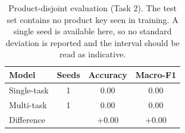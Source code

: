\begin{table}[t]
\caption{Product-disjoint evaluation (Task 2). The test set contains no product key seen in training. A single seed is available here, so no standard deviation is reported and the interval should be read as indicative.}
\label{tab:disjoint}
\centering
\small
\begin{tabular}{@{}lccc@{}}
\toprule
Model & Seeds & Accuracy & Macro-F1 \\
\midrule
Single-task \phobert{} & 1 & 0.00 & 0.00 \\
Multi-task \phobert{} & 1 & 0.00 & 0.00 \\
Difference & & +0.00 & +0.00 \\

\bottomrule
\end{tabular}
\end{table}
